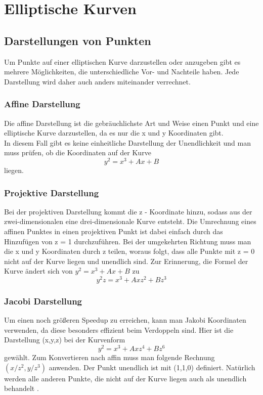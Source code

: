 \chapter{Elliptische Kurven}



\section{Darstellungen von Punkten}
Um Punkte auf einer elliptischen Kurve darzustellen oder anzugeben gibt es mehrere Möglichkeiten, die unterschiedliche Vor- und Nachteile haben. Jede Darstellung wird daher auch anders miteinander verrechnet.
\subsection{Affine Darstellung}
Die affine Darstellung ist die gebräuchlichste Art und Weise einen Punkt und eine elliptische Kurve darzustellen, da es nur die x und y Koordinaten gibt.\\
In diesem Fall gibt es keine einheitliche Darstellung der Unendlichkeit und man muss prüfen, ob die Koordinaten auf der Kurve \[y^2 = x^3 + Ax + B\] liegen.
\subsection{Projektive Darstellung}
Bei der projektiven Darstellung kommt die z - Koordinate hinzu, sodass aus der zwei-dimensionalen eine drei-dimensionale Kurve entsteht. Die Umrechnung eines affinen Punktes in einen projektiven Punkt ist dabei einfach durch das Hinzufügen von z = 1 durchzuführen. Bei der umgekehrten Richtung muss man die x und y Koordinaten durch z teilen, woraus folgt, dass alle Punkte mit z = 0 nicht auf der Kurve liegen und unendlich sind. Zur Erinnerung, die Formel der Kurve ändert sich von \(y^2 = x^3 + Ax + B\) zu \[y^2z = x^3 + Axz^2 + Bz^3\]

\subsection{Jacobi Darstellung}
Um einen noch größeren Speedup zu erreichen, kann man Jakobi Koordinaten verwenden, da diese besonders effizient beim Verdoppeln sind. Hier ist die Darstellung (x,y,z) bei der Kurvenform \[y^2 = x^3 + Axz^4 + Bz^6\] gewählt. Zum Konvertieren nach affin muss man folgende Rechnung \((x/z^2, y/z^3)\) anwenden. Der Punkt unendlich ist mit (1,1,0) definiert. Natürlich werden alle anderen Punkte, die nicht auf der Kurve liegen auch als unendlich behandelt \cite{Washington2003}.
\newpage
